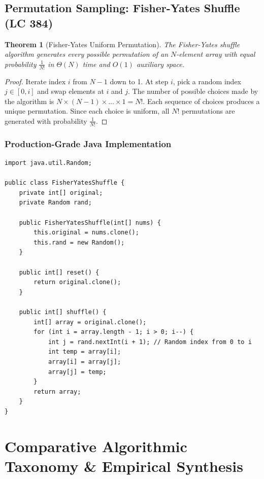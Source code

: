 \documentclass[10pt,journal,compsoc,onecolumn]{IEEEtran}
\newtheorem{theorem}{Theorem}
\begin{document}
\subsection{Permutation Sampling: Fisher-Yates Shuffle (LC 384)}

\begin{theorem}[Fisher-Yates Uniform Permutation]
The Fisher-Yates shuffle algorithm generates every possible permutation of an $N$-element array with equal probability $\frac{1}{N!}$ in $\Theta(N)$ time and $O(1)$ auxiliary space.
\end{theorem}

\begin{proof}
Iterate index $i$ from $N-1$ down to 1. At step $i$, pick a random index $j \in [0, i]$ and swap elements at $i$ and $j$.
The number of possible choices made by the algorithm is $N \times (N-1) \times \dots \times 1 = N!$. Each sequence of choices produces a unique permutation. Since each choice is uniform, all $N!$ permutations are generated with probability $\frac{1}{N!}$.
\end{proof}

\subsubsection{Production-Grade Java Implementation}

\begin{verbatim}
import java.util.Random;

public class FisherYatesShuffle {
    private int[] original;
    private Random rand;

    public FisherYatesShuffle(int[] nums) {
        this.original = nums.clone();
        this.rand = new Random();
    }

    public int[] reset() {
        return original.clone();
    }

    public int[] shuffle() {
        int[] array = original.clone();
        for (int i = array.length - 1; i > 0; i--) {
            int j = rand.nextInt(i + 1); // Random index from 0 to i
            int temp = array[i];
            array[i] = array[j];
            array[j] = temp;
        }
        return array;
    }
}
\end{verbatim}

\section{Comparative Algorithmic Taxonomy \& Empirical Synthesis}
\label{sec:comparative-analysis}
\end{document}
